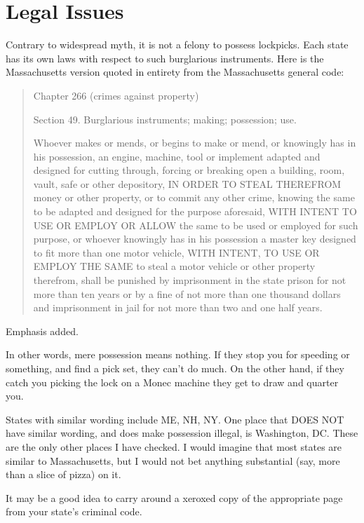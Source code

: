 \chapter{Legal Issues}
Contrary to widespread myth, it is not a felony to possess lockpicks. Each state has its own
laws with respect to such burglarious instruments. Here is the Massachusetts version quoted
in entirety from the Massachusetts general code:

\begin{quote}
    \begin{center}
        Chapter 266 (crimes against property)

        Section 49. Burglarious instruments; making; possession; use.
    \end{center}


    Whoever makes or mends, or begins to make or mend, or knowingly has in
    his possession, an engine, machine, tool or implement adapted and designed for
    cutting through, forcing or breaking open a building, room, vault, safe or other
    depository, IN ORDER TO STEAL THEREFROM money or other property, or
    to commit any other crime, knowing the same to be adapted and designed for
    the purpose aforesaid, WITH INTENT TO USE OR EMPLOY OR ALLOW
    the same to be used or employed for such purpose, or whoever knowingly has in
    his possession a master key designed to fit more than one motor vehicle, WITH
    INTENT, TO USE OR EMPLOY THE SAME to steal a motor vehicle or other
    property therefrom, shall be punished by imprisonment in the state prison for
    not more than ten years or by a fine of not more than one thousand dollars and
    imprisonment in jail for not more than two and one half years.
\end{quote}

Emphasis added.

In other words, mere possession means nothing. If they stop you for speeding or something,
and find a pick set, they can't do much. On the other hand, if they catch you picking
the lock on a Monec machine they get to draw and quarter you.

States with similar wording include ME, NH, NY. One place that DOES NOT have
similar wording, and does make possession illegal, is Washington, DC. These are the only
other places I have checked. I would imagine that most states are similar to Massachusetts,
but I would not bet anything substantial (say, more than a slice of pizza) on it.

It may be a good idea to carry around a xeroxed copy of the appropriate page from your
state's criminal code.
